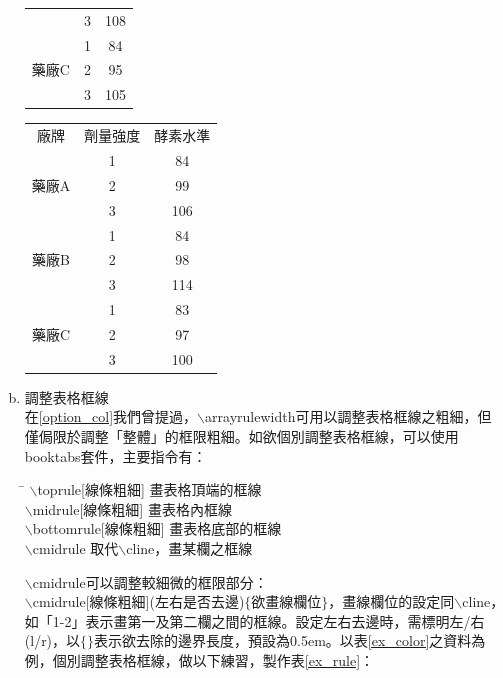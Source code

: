 \begin{enumerate}[a. ]
\begin{table}[!]
\begin{tabular}{|ccc|}
  									   & 3 & 108 \\				   
  		   		\multirow{3}{*}{藥廠C}  & 1 & 84 \\
  									   & 2 & 95 \\				   
  									   & 3 & 105 \\
  				\hline
    			\end{tabular} \hspace{1cm} \begin{tabular}{|ccc|}
    			\hline    			
  				廠牌 & 劑量強度  & 酵素水準		\\     
  				\multirow{3}{*}{藥廠A} & 1 & 84 \\
  									  & 2 & 99 \\				 
  									  & 3 & 106 \\  				  				
  				\multirow{3}{*}{藥廠B}  & 1 & 84 \\
  									   & 2 & 98 \\				   
  									   & 3 & 114 \\				   
  		   		\multirow{3}{*}{藥廠C}  & 1 & 83 \\
  									   & 2 & 97 \\				   
  									   & 3 & 100 \\
  				\hline
    			\end{tabular}
			\end{table}
	\item 調整表格框線 \\
	在\ref{option_col}我們曾提過，$\backslash$arrayrulewidth可用以調整表格框線之粗細，但僅侷限於調整「整體」的框限粗細。如欲個別調整表格框線，可以使用booktabs套件，主要指令有：
		\begin{tabbing}
 		\hspace{16em} \= \hspace{5em} \kill
 		$\backslash$toprule[線條粗細] \> 畫表格頂端的框線 \\
		$\backslash$midrule[線條粗細] \> 畫表格內框線 \\
		$\backslash$bottomrule[線條粗細] \> 畫表格底部的框線 \\
		$\backslash$cmidrule \> 取代$\backslash$cline，畫某欄之框線
 		\end{tabbing}	
 	$\backslash$cmidrule可以調整較細微的框限部分：\\
 	$\backslash$cmidrule[線條粗細](左右是否去邊)$\{$欲畫線欄位$\}$，畫線欄位的設定同$\backslash$cline，如「1-2」表示畫第一及第二欄之間的框線。設定左右去邊時，需標明左/右(l/r)，以$\{ \}$表示欲去除的邊界長度，預設為0.5em。以表\ref{ex_color}之資料為例，個別調整表格框線，做以下練習，製作表\ref{ex_rule}：

\end{enumerate}
